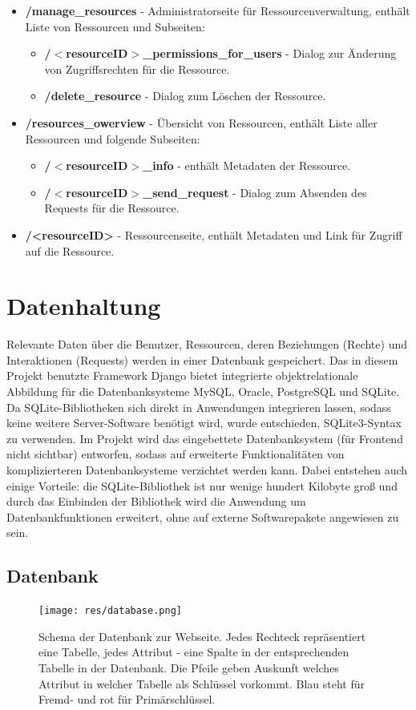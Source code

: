 \documentclass[parskip=full,11pt]{scrartcl}
\begin{document}
\begin{itemize}[itemsep=0pt]
\item \textbf{/manage{\_}resources} - Administratorseite für Ressourcenverwaltung, enthält Liste von Ressourcen und Subseiten:
\begin{itemize}[itemsep=0pt]
\item \textbf{/$<$resourceID$>${\_}permissions{\_}for{\_}users} - Dialog zur Änderung von Zugriffsrechten für die Ressource. 
\item \textbf{/delete{\_}resource} - Dialog zum Löschen der Ressource.
\end{itemize}
\item \textbf{/resources{\_}owerview} - Übersicht von Ressourcen, enthält Liste aller Ressourcen und folgende Subseiten:
\begin{itemize}[itemsep=0pt]
\item \textbf{/$<$resourceID$>${\_}info} - enthält Metadaten der Ressource.
\item \textbf{/$<$resourceID$>${\_}send{\_}request} - Dialog zum Absenden des Requests für die Ressource.
\end{itemize}
\item \textbf{/<resourceID>} - Ressourcenseite, enthält Metadaten und Link für Zugriff auf die Ressource.
\end{itemize} 

 
 \newpage
 \section{Datenhaltung}

Relevante Daten über die Benutzer, Ressourcen, deren Beziehungen (Rechte) und Interaktionen (Requests) werden in einer Datenbank gespeichert. Das in diesem Projekt benutzte Framework Django bietet integrierte  objektrelationale Abbildung für die Datenbanksysteme MySQL, Oracle, PostgreSQL und SQLite.\\
Da SQLite-Bibliotheken sich direkt in Anwendungen integrieren lassen, sodass keine weitere Server-Software benötigt wird, wurde entschieden, SQLite3-Syntax zu verwenden. Im Projekt wird das eingebettete Datenbanksystem (für Frontend nicht sichtbar) entworfen, sodass auf erweiterte Funktionalitäten von komplizierteren Datenbanksysteme verzichtet werden kann. Dabei entstehen auch einige Vorteile: die SQLite-Bibliothek ist nur wenige hundert Kilobyte groß und durch das Einbinden der Bibliothek wird die Anwendung um Datenbankfunktionen erweitert, ohne auf externe Softwarepakete angewiesen zu sein.
 \subsection{Datenbank}
 \begin{figure}[ht!]
 	\centering
 	\texttt{[image: res/database.png]}
 	\caption{Schema der Datenbank zur Webseite. Jedes Rechteck repräsentiert eine Tabelle, jedes Attribut - eine Spalte in der entsprechenden Tabelle in der Datenbank. Die Pfeile geben Auskunft welches Attribut in welcher Tabelle als Schlüssel vorkommt. Blau steht für Fremd- und rot für Primärschlüssel.}
 \end{figure}
 \newpage
 
\end{document}

